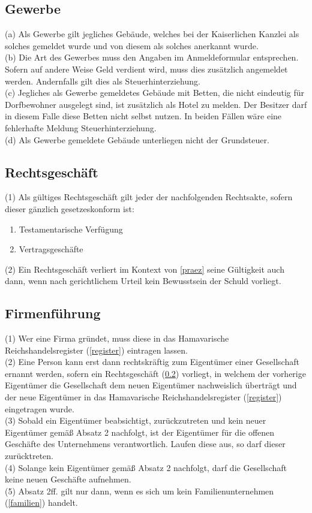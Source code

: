 \documentclass{article}
\begin{document}
\subsection{Gewerbe}
(a) Als Gewerbe gilt jegliches Gebäude, welches bei der Kaiserlichen Kanzlei als solches gemeldet wurde und von diesem als solches anerkannt wurde.\\
(b) Die Art des Gewerbes muss den Angaben im Anmeldeformular entsprechen. Sofern auf andere Weise Geld verdient wird, muss dies zusätzlich angemeldet werden. Andernfalls gilt dies als Steuerhinterziehung.\\
(c) Jegliches als Gewerbe gemeldetes Gebäude mit Betten, die nicht eindeutig für Dorfbewohner ausgelegt sind, ist zusätzlich als Hotel zu melden. Der Besitzer darf in diesem Falle diese Betten nicht selbst nutzen. In beiden Fällen wäre eine fehlerhafte Meldung Steuerhinterziehung.\\
(d) Als Gewerbe gemeldete Gebäude unterliegen nicht der Grundsteuer.

\subsection{Rechtsgeschäft}\label{rechtsg}
(1) Als gültiges Rechtsgeschäft gilt jeder der nachfolgenden Rechtsakte, sofern dieser gänzlich gesetzeskonform ist:
\begin{enumerate}
	\item Testamentarische Verfügung
	\item Vertragsgeschäfte
\end{enumerate}
(2) Ein Rechtsgeschäft verliert im Kontext von \ref{praez} seine Gültigkeit auch dann, wenn nach gerichtlichem Urteil kein Bewusstsein der Schuld vorliegt.

\subsection{Firmenführung}\label{firm}
(1) Wer eine Firma gründet, muss diese in das Hamavarische Reichshandelsregister (\ref{register}) eintragen lassen.\\
(2) Eine Person kann erst dann rechtskräftig zum Eigentümer einer Gesellschaft ernannt werden, sofern ein Rechtsgeschäft (\ref{rechtsg}) vorliegt, in welchem der vorherige Eigentümer die Gesellschaft dem neuen Eigentümer nachweislich überträgt und der neue Eigentümer in das Hamavarische Reichshandelsregister (\ref{register}) eingetragen wurde.\\
(3) Sobald ein Eigentümer beabsichtigt, zurückzutreten und kein neuer Eigentümer gemäß Absatz 2 nachfolgt, ist der Eigentümer für die offenen Geschäfte des Unternehmens verantwortlich. Laufen diese aus, so darf dieser zurücktreten.\\
(4) Solange kein Eigentümer gemäß Absatz 2 nachfolgt, darf die Gesellschaft keine neuen Geschäfte aufnehmen.\\
(5) Absatz 2ff. gilt nur dann, wenn es sich um kein Familienunternehmen (\ref{familien}) handelt.
\end{document}
